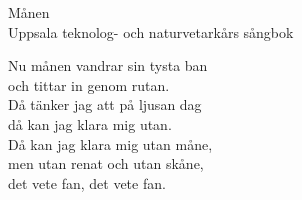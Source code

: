   {\Large Månen}\\{\tiny  Uppsala teknolog- och naturvetarkårs sångbok}
  \begin{vers}
Nu månen vandrar sin tysta ban \\
och tittar in genom rutan. \\
Då tänker jag att på ljusan dag \\
då kan jag klara mig utan. \\
Då kan jag klara mig utan måne, \\
men utan renat och utan skåne, \\
det vete fan, det vete fan. \\
\end{vers}
 
